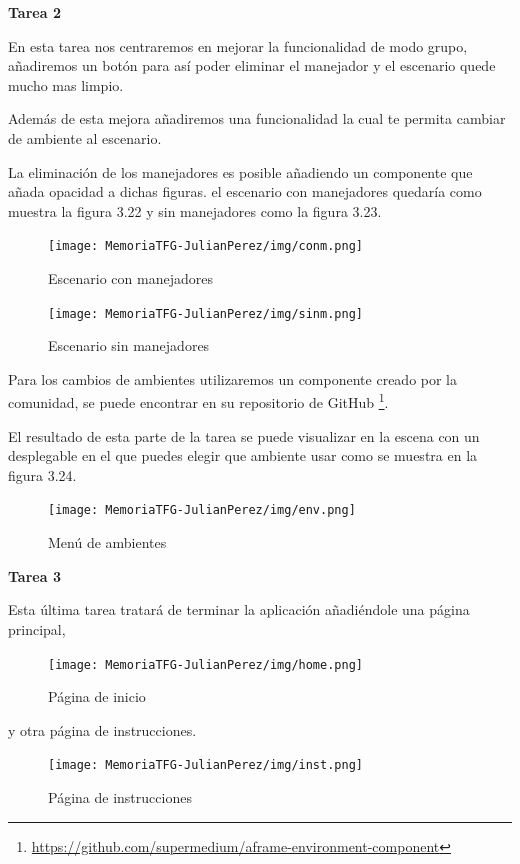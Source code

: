 \documentclass[a4paper, 12pt]{book}
\begin{document}
\textbf{Tarea 2}

En esta tarea nos centraremos en mejorar la funcionalidad de modo grupo, añadiremos un botón para así poder eliminar el manejador y el escenario quede mucho mas limpio.

Además de esta mejora añadiremos una funcionalidad la cual te permita cambiar de ambiente al escenario.

La eliminación de los manejadores es posible añadiendo un componente que añada opacidad a dichas figuras. el escenario con manejadores quedaría como muestra la figura 3.22 y sin manejadores como la figura 3.23.

\begin{figure}[H]
  \centering
  \begin{minipage}[b]{0.4\textwidth}
 \texttt{[image: MemoriaTFG-JulianPerez/img/conm.png]}
  \caption{Escenario con manejadores}\label{single}
  \end{minipage}
  \hfill
  \begin{minipage}[b]{0.4\textwidth}
  \texttt{[image: MemoriaTFG-JulianPerez/img/sinm.png]}
  \caption{Escenario sin manejadores}\label{scrum}
  \end{minipage}
\end{figure}

Para los cambios de ambientes utilizaremos un componente creado por la comunidad, se puede encontrar en su repositorio de GitHub \footnote{\url{https://github.com/supermedium/aframe-environment-component}}. 

El resultado de esta parte de la tarea se puede visualizar en la escena con un desplegable en el que puedes elegir que ambiente usar como se muestra en la figura 3.24.

\begin{figure}[H]
  \centering
  \texttt{[image: MemoriaTFG-JulianPerez/img/env.png]}
  \caption{Menú de ambientes}\label{menu2}
\end{figure}

\textbf{Tarea 3}

Esta última tarea tratará de terminar la aplicación añadiéndole una página principal,

\begin{figure}[H]
  \centering
  \texttt{[image: MemoriaTFG-JulianPerez/img/home.png]}
  \caption{Página de inicio}\label{home}
\end{figure}

y otra página de instrucciones.

\begin{figure}[H]
  \centering
  \texttt{[image: MemoriaTFG-JulianPerez/img/inst.png]}
  \caption{Página de instrucciones}\label{home}
\end{figure}
\end{document}
